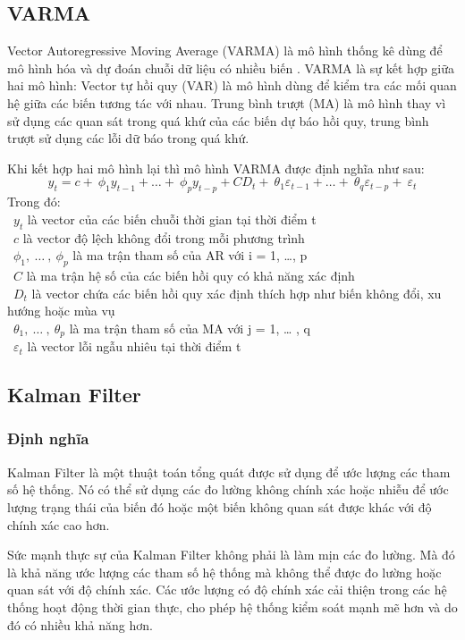 \subsection{VARMA}
Vector Autoregressive Moving Average (VARMA) là mô hình thống kê dùng để mô hình hóa và dự đoán chuỗi dữ liệu có nhiều biến . VARMA là sự kết hợp giữa hai mô hình: Vector tự hồi quy (VAR) là mô hình dùng để kiểm tra các mối quan hệ giữa các biến tương tác với nhau. Trung bình trượt (MA) là mô hình thay vì sử dụng các quan sát trong quá khứ của các biến dự báo hồi quy, trung bình trượt sử dụng các lỗi dữ báo trong quá khứ. 
\par
Khi kết hợp hai mô hình lại thì mô hình VARMA được định nghĩa như sau:
\[y_{t} = c + \ \phi_{1}y_{t - 1} + \ldots + \ \phi_{p}y_{t - p} + CD_{t} + \ \theta_{1}\varepsilon_{t - 1} + \ldots + \ \theta_{q}\varepsilon_{t - p} + \ \varepsilon_{t}\]
Trong đó:\\
    \indent\textbullet\ \(y_{t}\) là vector của các biến chuỗi thời gian tại thời điểm t\\
    \indent\textbullet\ \(c\) là vector độ lệch không đổi trong mỗi phương trình\\
    \indent\textbullet\ \(\phi_{1},\ \ldots\ ,\ \phi_{p}\) là ma trận tham số của AR với i = 1, …, p\\
    \indent\textbullet\ \(C\) là ma trận hệ số của các biến hồi quy có khả năng xác định\\
    \indent\textbullet\ \(D_{t}\) là vector chứa các biến hồi quy xác định thích hợp như biến không đổi, xu hướng hoặc mùa vụ\\
    \indent\textbullet\ \(\theta_{1},\ \ldots\ ,\ \theta_{p}\) là ma trận tham số của MA với j = 1, … , q\\
    \indent\textbullet\ \(\varepsilon_{t}\) là vector lỗi ngẫu nhiêu tại thời điểm t\\

\subsection{Kalman Filter}
\subsubsection{Định nghĩa}
Kalman Filter là một thuật toán tổng quát được sử dụng để ước lượng các tham số hệ thống. Nó có thể sử dụng các đo lường không chính xác hoặc nhiễu để ước lượng trạng thái của biến đó hoặc một biến không quan sát được khác với độ chính xác cao hơn.
\par
Sức mạnh thực sự của Kalman Filter không phải là làm mịn các đo lường. Mà đó là khả năng ước lượng các tham số hệ thống mà không thể được đo lường hoặc quan sát với độ chính xác. Các ước lượng có độ chính xác cải thiện trong các hệ thống hoạt động thời gian thực, cho phép hệ thống kiểm soát mạnh mẽ hơn và do đó có nhiều khả năng hơn.

